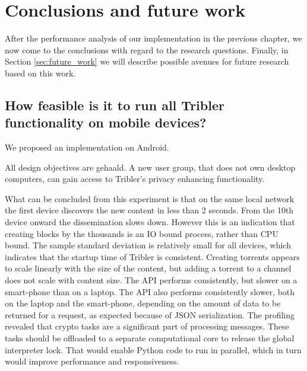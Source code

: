 \chapter{Conclusions and future work}\label{ch:conclusions}
After the performance analysis of our implementation in the previous chapter, we now come to the conclusions with regard to the research questions.
Finally, in Section \ref{sec:future_work} we will describe possible avenues for future research based on this work.


\section{How feasible is it to run all Tribler functionality on mobile devices?} %
We proposed an implementation on Android.




All design objectives are gehaald.
A new user group, that does not own desktop computers, can gain access to Tribler's privacy enhancing functionality.




What can be concluded from this experiment is that on the same local network the first device discovers the new content in less than 2 seconds.
From the 10th device onward the dissemination slows down.
However this is an indication that creating blocks by the thousands is an IO bound process, rather than CPU bound.
The sample standard deviation is relatively small for all devices, which indicates that the startup time of Tribler is consistent.
Creating torrents appears to scale linearly with the size of the content, but adding a torrent to a channel does not scale with content size.
The API performs consistently, but slower on a smart-phone than on a laptop.
The API also performs consistently slower, both on the laptop and the smart-phone, depending on the amount of data to be returned for a request, as expected because of JSON serialization.
The profiling revealed that crypto tasks are a significant part of processing messages.
These tasks should be offloaded to a separate computational core to release the global interpreter lock.
That would enable Python code to run in parallel, which in turn would improve performance and responsiveness.





